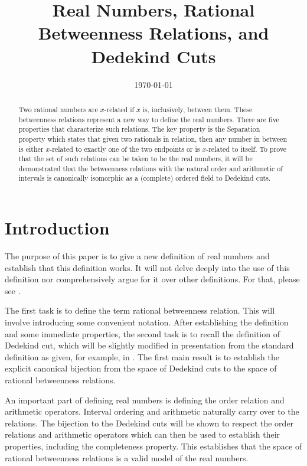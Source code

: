 \documentclass[12pt]{article}
\title{Real Numbers, Rational Betweenness Relations, and Dedekind Cuts}
\date{\today}
\begin{document}
\maketitle
\begin{abstract}
Two rational numbers are $x$-related if $x$ is, inclusively, between them. These betweenness relations represent a new way to define the real numbers. There are five properties that characterize such relations. The key property is the Separation property which states that given two rationals in relation, then any number in between is either $x$-related to exactly one of the two endpoints or is $x$-related to itself. To prove that the set of such relations can be taken to be the real numbers, it will be demonstrated that the betweenness relations with the natural order and arithmetic of intervals is canonically isomorphic as a (complete) ordered field to Dedekind cuts. 
\end{abstract}

\section{Introduction}

The purpose of this paper is to give a new definition of real numbers and establish that this definition works. It will not delve deeply into the use of this definition nor comprehensively argue for it over other definitions. For that, please see \cite{taylor23main}. 

The first task is to define the term rational betweenness relation. This will involve introducing some convenient notation. After establishing the definition and some immediate properties, the second task is to recall the definition of Dedekind cut, which will be slightly modified in presentation from the standard definition as given, for example, in \cite{rudin}. The first main result is to establish the explicit canonical bijection from the space of Dedekind cuts to the space of rational betweenness relations. 

An important part of defining real numbers is defining the order relation and arithmetic operators. Interval ordering and arithmetic naturally carry over to the relations. The bijection to the Dedekind cuts will be shown to respect the order relations and arithmetic operators which can then be used to establish their properties, including the completeness property.   This establishes that the space of rational betweenness relations is a valid model of the real numbers. 
\end{document}
